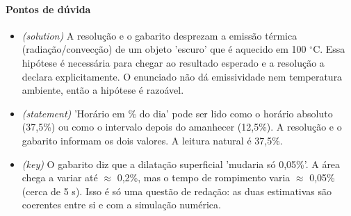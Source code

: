 \documentclass{article}%
\begin{document}
\paragraph{Pontos de dúvida}%
\begin{itemize}%
\item%
\textit{(solution)} A resolução e o gabarito desprezam a emissão térmica (radiação/convecção) de um objeto 'escuro' que é aquecido em 100 $^\circ$C. Essa hipótese é necessária para chegar ao resultado esperado e a resolução a declara explicitamente. O enunciado não dá emissividade nem temperatura ambiente, então a hipótese é razoável.%
\item%
\textit{(statement)} 'Horário em \% do dia' pode ser lido como o horário absoluto (37,5\%) ou como o intervalo depois do amanhecer (12,5\%). A resolução e o gabarito informam os dois valores. A leitura natural é 37,5\%.%
\item%
\textit{(key)} O gabarito diz que a dilatação superficial 'mudaria só 0,05\%'. A área chega a variar até $\approx$ 0,2\%, mas o tempo de rompimento varia $\approx$ 0,05\% (cerca de 5 s). Isso é só uma questão de redação: as duas estimativas são coerentes entre si e com a simulação numérica.%
\end{itemize}%
\end{document}
